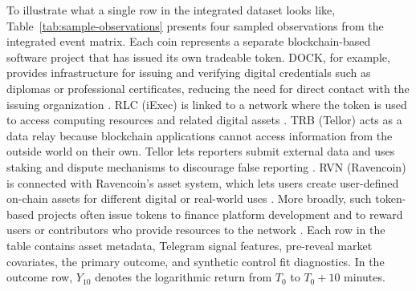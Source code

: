To illustrate what a single row in the integrated dataset looks like, Table~\ref{tab:sample-observations} presents four sampled observations from the integrated event matrix. Each coin represents a separate blockchain-based software project that has issued its own tradeable token. DOCK, for example, provides infrastructure for issuing and verifying digital credentials such as diplomas or professional certificates, reducing the need for direct contact with the issuing organization \cite{dock2026dids}. RLC (iExec) is linked to a network where the token is used to access computing resources and related digital assets \cite{iexec2025tokenomics}. TRB (Tellor) acts as a data relay because blockchain applications cannot access information from the outside world on their own. Tellor lets reporters submit external data and uses staking and dispute mechanisms to discourage false reporting \cite{tellor2026fundamentals, tellor2026disputes}. RVN (Ravencoin) is connected with Ravencoin's asset system, which lets users create user-defined on-chain assets for different digital or real-world uses \cite{ravencoin2026assets}. More broadly, such token-based projects often issue tokens to finance platform development and to reward users or contributors who provide resources to the network \cite{cong2022tokenbased}. Each row in the table contains asset metadata, Telegram signal features, pre-reveal market covariates, the primary outcome, and synthetic control fit diagnostics. In the outcome row, $Y_{10}$ denotes the logarithmic return from $T_0$ to $T_0+10$ minutes.

